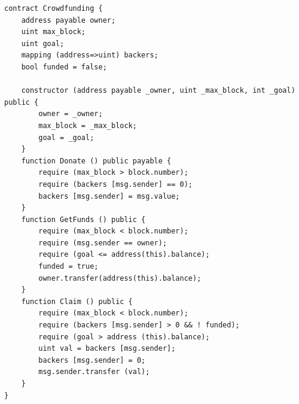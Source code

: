 \begin{lstlisting}[language=Solidity, label={code:crowdfunding-solidity}, caption=Implementación de la recaudación]
contract Crowdfunding {
    address payable owner;
    uint max_block;
    uint goal;
    mapping (address=>uint) backers;
    bool funded = false;
    
    constructor (address payable _owner, uint _max_block, int _goal) public {
        owner = _owner;
        max_block = _max_block;
        goal = _goal;
    }
    function Donate () public payable {
        require (max_block > block.number);
        require (backers [msg.sender] == 0);
        backers [msg.sender] = msg.value;
    }
    function GetFunds () public {
        require (max_block < block.number);
        require (msg.sender == owner);
        require (goal <= address(this).balance);
        funded = true;
        owner.transfer(address(this).balance);
    }
    function Claim () public {
        require (max_block < block.number);
        require (backers [msg.sender] > 0 && ! funded);
        require (goal > address (this).balance);
        uint val = backers [msg.sender];
        backers [msg.sender] = 0;
        msg.sender.transfer (val);
    }
}
    
\end{lstlisting}